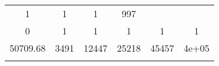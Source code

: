 \documentclass[]{book}
\theoremstyle{definition}
\theoremstyle{definition}
\theoremstyle{definition}
\theoremstyle{remark}
\begin{document}
\begin{longtable}[]{@{}cccccc@{}}
\begin{minipage}[t]{0.13\columnwidth}
1\strut
\end{minipage} & \begin{minipage}[t]{0.13\columnwidth}\centering\strut
1\strut
\end{minipage} & \begin{minipage}[t]{0.13\columnwidth}\centering\strut
1\strut
\end{minipage} & \begin{minipage}[t]{0.13\columnwidth}\centering\strut
997\strut
\end{minipage}\tabularnewline
\begin{minipage}[t]{0.15\columnwidth}\centering\strut
0\strut
\end{minipage} & \begin{minipage}[t]{0.13\columnwidth}\centering\strut
1\strut
\end{minipage} & \begin{minipage}[t]{0.13\columnwidth}\centering\strut
1\strut
\end{minipage} & \begin{minipage}[t]{0.13\columnwidth}\centering\strut
1\strut
\end{minipage} & \begin{minipage}[t]{0.13\columnwidth}\centering\strut
1\strut
\end{minipage} & \begin{minipage}[t]{0.13\columnwidth}\centering\strut
1\strut
\end{minipage}\tabularnewline
\begin{minipage}[t]{0.15\columnwidth}\centering\strut
50709.68\strut
\end{minipage} & \begin{minipage}[t]{0.13\columnwidth}\centering\strut
3491\strut
\end{minipage} & \begin{minipage}[t]{0.13\columnwidth}\centering\strut
12447\strut
\end{minipage} & \begin{minipage}[t]{0.13\columnwidth}\centering\strut
25218\strut
\end{minipage} & \begin{minipage}[t]{0.13\columnwidth}\centering\strut
45457\strut
\end{minipage} & \begin{minipage}[t]{0.13\columnwidth}\centering\strut
4e+05\strut
\end{minipage}\tabularnewline
\begin{minipage}[t]{0.15\columnwidth}\centering\strut

\end{minipage}
\end{longtable}
\end{document}
